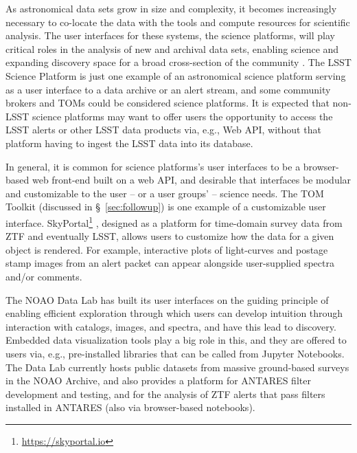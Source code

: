 As astronomical data sets grow in size and complexity, it becomes increasingly necessary to co-locate the data with the tools and compute resources for scientific analysis.
The user interfaces for these systems, the science platforms, will play critical roles in the analysis of new and archival data sets, enabling science and expanding discovery space for a broad cross-section of the community \citep[e.g.,][]{2019arXiv190305130O}.
The \gls{LSST} \gls{Science Platform} is just one example of an astronomical science platform serving as a user interface to a data archive or an alert stream, and some community brokers and TOMs could be considered science platforms.
It is expected that non-LSST science platforms may want to offer users the opportunity to access the \gls{LSST} alerts or other \gls{LSST} data products via, e.g., Web \gls{API}, without that platform having to ingest the \gls{LSST} data into its database.

In general, it is common for science platforms's user interfaces to be a browser-based web front-end built on a web \gls{API}, and desirable that interfaces be modular and customizable to the user -- or a user groups' -- science needs.
The \gls{TOM} Toolkit (discussed in \S~\ref{sec:followup}) is one example of a customizable user interface.
SkyPortal\footnote{\url{https://skyportal.io}} \citep{skyportal2019}, designed as a platform for time-domain survey data from \gls{ZTF} and eventually \gls{LSST}, allows users to customize how the data for a given object is rendered.
For example, interactive plots of light-curves and \gls{postage stamp} images from an alert packet can appear alongside user-supplied spectra and/or comments.

The \gls{NOAO} Data Lab \citep{2019arXiv190800664O} has built its user interfaces on the guiding principle of enabling efficient exploration through which users can develop intuition through interaction with catalogs, images, and spectra, and have this lead to discovery.
Embedded data visualization tools play a big role in this, and they are offered to users via, e.g., pre-installed libraries that can be called from Jupyter Notebooks.
The Data Lab currently hosts public datasets from massive ground-based surveys in the \gls{NOAO} \gls{Archive}, and also provides a platform for \gls{ANTARES} filter development and testing, and for the analysis of \gls{ZTF} alerts that pass filters installed in \gls{ANTARES} (also via browser-based notebooks). 


